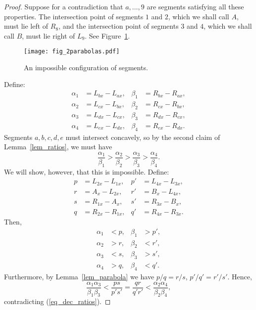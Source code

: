 \documentclass[11pt]{article}
\theoremstyle{definition}
\theoremstyle{remark}
\begin{document}
\begin{proof}
Suppose for a contradiction that $a,\ldots,9$ are segments satisfying all these properties. The intersection point of segments $1$ and $2$, which we shall call $A$, must lie left of $R_8$, and the intersection point of segments $3$ and $4$, which we shall call $B$, must lie right of $L_9$. See Figure~\ref{fig_2parabolas}.

\begin{figure}
\centerline{\texttt{[image: fig\_2parabolas.pdf]}}
\caption{\label{fig_2parabolas}An impossible configuration of segments.}
\end{figure}

Define:
\begin{align*}
\alpha_1 &=L_{bx} - L_{ax}, & \beta_1 &=R_{bx}-R_{ax},\\
\alpha_2 &=L_{cx} - L_{bx}, & \beta_2 &=R_{cx}-R_{bx},\\
\alpha_3 &=L_{dx} - L_{cx}, & \beta_3 &=R_{dx}-R_{cx},\\
\alpha_4 &=L_{ex} - L_{dx}, & \beta_4 &=R_{ex}-R_{dx}.
\end{align*}
Segments $a,b,c,d,e$ must intersect concavely, so by the second claim of Lemma~\ref{lem_ratios}, we must have
\begin{equation}\label{eq_dec_ratios}
\frac{\alpha_1}{\beta_1} > \frac{\alpha_2}{\beta_2} > \frac{\alpha_3}{\beta_3} > \frac{\alpha_4}{\beta_4}.
\end{equation}
We will show, however, that this is impossible.
Define:
\begin{align*}
p &= L_{2x} - L_{1x}, & p' &= L_{4x} - L_{3x},\\
r &= A_x    - L_{2x}, & r' &= B_x    - L_{4x},\\
s &= R_{1x} - A_x   , & s' &= R_{3x} - B_x   ,\\
q &= R_{2x} - R_{1x}, & q' &= R_{4x} - R_{3x}.
\end{align*}
Then,
\begin{align*}
\alpha_1 &< p, & \beta_1 &> p',\\
\alpha_2 &> r, & \beta_2 &< r',\\
\alpha_3 &< s, & \beta_3 &> s',\\
\alpha_4 &> q, & \beta_4 &< q'.
\end{align*}
Furthermore, by Lemma~\ref{lem_parabola} we have $p/q = r/s$, $p'/q' = r'/s'$. Hence,
\begin{equation*}
\frac{\alpha_1\alpha_3}{\beta_1\beta_3} < \frac{ps}{p's'} = \frac{qr}{q'r'} < \frac{\alpha_2\alpha_4}{\beta_2\beta_4},
\end{equation*}
contradicting (\ref{eq_dec_ratios}).
\end{proof}
\end{document}
